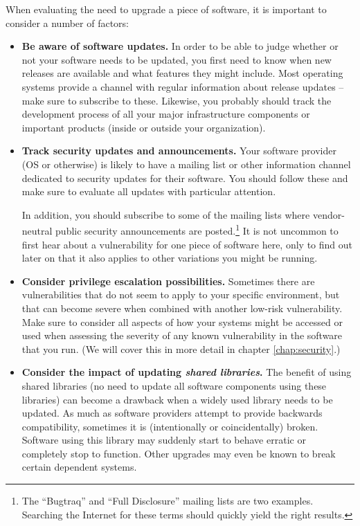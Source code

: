 When evaluating the need to upgrade a piece of software, it is important
to consider a number of factors:

\begin{itemize}

	\item {\bf Be aware of software updates.}  In order to be able to
		judge whether or not your software needs to be updated,
		you first need to know when new releases are available and
		what features they might include.  Most operating systems
		provide a channel with regular information about release
		updates -- make sure to subscribe to these.  Likewise, you
		probably should track the development process of all your
		major infrastructure components or important products
		(inside or outside your organization).

	\item {\bf Track security updates and announcements.}  Your
		software provider (OS or otherwise) is likely to have a
		mailing list or other information channel dedicated to
		security updates for their software.  You should follow
		these and make sure to evaluate all updates with
		particular attention.

		In addition, you should subscribe to some of the
		mailing lists where vendor-neutral public security
		announcements are posted.\footnote{The ``Bugtraq'' and ``Full
		Disclosure'' mailing lists are two examples.  Searching
		the Internet for these terms should quickly yield the
		right results.} It is not uncommon to first hear about a
		vulnerability for one piece of software here, only to
		find out later on that it also applies to other variations
		you might be running.

	\item {\bf Consider privilege escalation possibilities.}
		Sometimes there are vulnerabilities that do not seem to
		apply to your specific environment, but that can become
		severe when combined with another low-risk vulnerability.
		Make sure to consider all aspects of how your systems
		might be accessed or used when assessing the severity of
		any known vulnerability in the software that you run.
		(We will cover this in more detail in chapter
		\ref{chap:security}.)

	\item {\bf Consider the impact of updating {\em shared
		libraries}.}  The benefit of using shared libraries (no
		need to update all software components using these
		libraries) can become a drawback when a widely used
		library needs to be updated.  As much as software
		providers attempt to provide backwards compatibility,
		sometimes it is (intentionally or coincidentally) broken.
		Software using this library may suddenly start to behave
		erratic or completely stop to function.  Other upgrades
		may even be known to break certain dependent systems.


\end{itemize}
